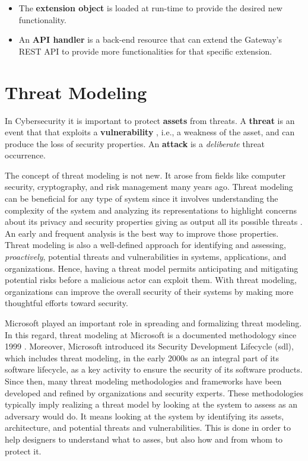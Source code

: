 \begin{itemize}
    \item The \textbf{extension object} is loaded at run-time to provide the desired new functionality.
    \item An \textbf{API handler} is a back-end resource that can extend the Gateway's REST API to provide more functionalities for that specific extension.
\end{itemize}



\section{Threat Modeling}
In Cybersecurity it is important to protect \textbf{assets} from threats. A \textbf{threat} \cite{mayer2007design} is an event that that exploits a \textbf{vulnerability} \cite{mayer2007design}, i.e., a weakness of the asset, and can produce the loss of security properties. An \textbf{attack} \cite{mayer2007design} is a \textit{deliberate} threat occurrence.

The concept of threat modeling is not new. It arose from fields like computer security, cryptography, and risk management many years ago. Threat modeling can be beneficial for any type of system since it involves understanding the complexity of the system and analyzing its representations to highlight concerns about its privacy and security properties giving as output all its possible threats \cite{myagmar2005threat, threatmodelingmanifesto}. An early and frequent analysis is the best way to improve those properties. Threat modeling is also a well-defined approach for identifying and assessing, \textit{proactively}, potential threats and vulnerabilities in systems, applications, and organizations. Hence, having a threat model permits anticipating and mitigating potential risks before a malicious actor can exploit them. With threat modeling, organizations can improve the overall security of their systems by making more thoughtful efforts toward security.

Microsoft
played an important role in spreading and formalizing threat modeling. In this regard, threat modeling at Microsoft is a documented methodology since 1999 \cite{shostack2008experiences}. Moreover, Microsoft introduced its Security Development Lifecycle (\gls{sdl}), which includes threat modeling, in the early 2000s as an integral part of its software lifecycle, as a key activity to ensure the security of its software products. Since then, many threat modeling methodologies and frameworks have been developed and refined by organizations and security experts. These methodologies typically imply realizing a threat model by looking at the system to assess as an adversary would do. It means looking at the system by identifying its assets, architecture, and potential threats and vulnerabilities. This is done in order to help designers to understand what to asses, but also how and from whom to protect it. 

